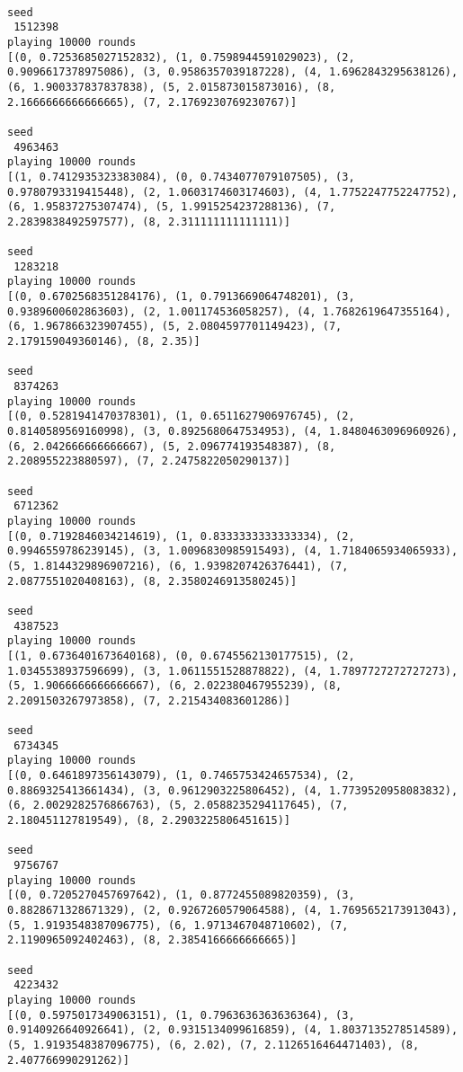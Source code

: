 \documentclass[11pt]{article}
\begin{document}
\begin{verbatim}
    
seed
 1512398
playing 10000 rounds
[(0, 0.7253685027152832), (1, 0.7598944591029023), (2, 0.9096617378975086), (3, 0.9586357039187228), (4, 1.6962843295638126), (6, 1.900337837837838), (5, 2.015873015873016), (8, 2.1666666666666665), (7, 2.1769230769230767)]

seed
 4963463
playing 10000 rounds
[(1, 0.7412935323383084), (0, 0.7434077079107505), (3, 0.9780793319415448), (2, 1.0603174603174603), (4, 1.7752247752247752), (6, 1.95837275307474), (5, 1.9915254237288136), (7, 2.2839838492597577), (8, 2.311111111111111)]

seed
 1283218
playing 10000 rounds
[(0, 0.6702568351284176), (1, 0.7913669064748201), (3, 0.9389600602863603), (2, 1.001174536058257), (4, 1.7682619647355164), (6, 1.967866323907455), (5, 2.0804597701149423), (7, 2.179159049360146), (8, 2.35)]

seed
 8374263
playing 10000 rounds
[(0, 0.5281941470378301), (1, 0.6511627906976745), (2, 0.8140589569160998), (3, 0.8925680647534953), (4, 1.8480463096960926), (6, 2.042666666666667), (5, 2.096774193548387), (8, 2.208955223880597), (7, 2.2475822050290137)]

seed
 6712362
playing 10000 rounds
[(0, 0.7192846034214619), (1, 0.8333333333333334), (2, 0.9946559786239145), (3, 1.0096830985915493), (4, 1.7184065934065933), (5, 1.8144329896907216), (6, 1.9398207426376441), (7, 2.0877551020408163), (8, 2.3580246913580245)]

seed
 4387523
playing 10000 rounds
[(1, 0.6736401673640168), (0, 0.6745562130177515), (2, 1.0345538937596699), (3, 1.0611551528878822), (4, 1.7897727272727273), (5, 1.9066666666666667), (6, 2.022380467955239), (8, 2.2091503267973858), (7, 2.215434083601286)]

seed
 6734345
playing 10000 rounds
[(0, 0.6461897356143079), (1, 0.7465753424657534), (2, 0.8869325413661434), (3, 0.9612903225806452), (4, 1.7739520958083832), (6, 2.0029282576866763), (5, 2.0588235294117645), (7, 2.180451127819549), (8, 2.2903225806451615)]

seed
 9756767
playing 10000 rounds
[(0, 0.7205270457697642), (1, 0.8772455089820359), (3, 0.8828671328671329), (2, 0.9267260579064588), (4, 1.7695652173913043), (5, 1.9193548387096775), (6, 1.9713467048710602), (7, 2.1190965092402463), (8, 2.3854166666666665)]

seed
 4223432
playing 10000 rounds
[(0, 0.5975017349063151), (1, 0.7963636363636364), (3, 0.9140926640926641), (2, 0.9315134099616859), (4, 1.8037135278514589), (5, 1.9193548387096775), (6, 2.02), (7, 2.1126516464471403), (8, 2.407766990291262)]


\end{verbatim}
\end{document}
